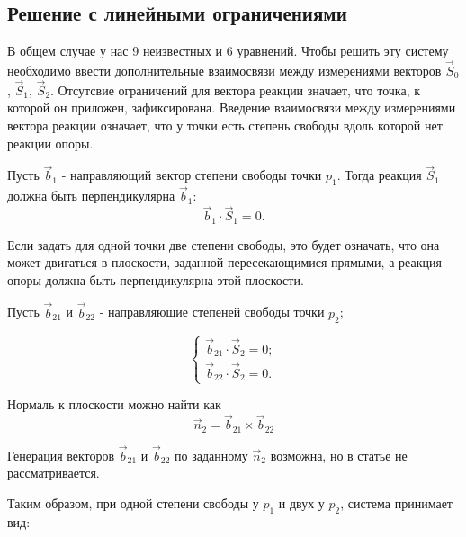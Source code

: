 \subsection{Решение с линейными ограничениями}

В общем случае у нас 9 неизвестных и 6 уравнений.
Чтобы решить эту систему необходимо ввести дополнительные взаимосвязи между измерениями векторов $\vec{S}_0$, $\vec{S}_1$, $\vec{S}_2$.
Отсутсвие ограничений для вектора реакции значает, что точка, к которой он приложен, зафиксирована.
Введение взаимосвязи между измерениями вектора реакции означает, что у точки есть степень свободы вдоль которой нет реакции опоры.

Пусть $\vec b_1$ - направляющий вектор степени свободы точки $p_1$.
Тогда реакция $\vec S_1$ должна быть перпендикулярна $\vec b_1$:
\begin{equation}
	\vec b_1 \cdot \vec S_1 = 0.
\end{equation}

Если задать для одной точки две степени свободы, это будет означать, что она может двигаться в плоскости, заданной пересекающимися прямыми, а реакция опоры должна быть перпендикулярна этой плоскости.

Пусть $\vec b_{21}$ и $\vec b_{22}$ - направляющие степеней свободы точки $p_2$;

\begin{equation}
\left\{
	\begin{gathered}
		\vec b_{21} \cdot \vec S_2 = 0;\\
		\vec b_{22} \cdot \vec S_2 = 0.
	\end{gathered}
\right.
\end{equation}

Нормаль к плоскости можно найти как $$\vec n_2 = \vec b_{21} \times \vec b_{22}$$

Генерация векторов $\vec b_{21}$ и $\vec b_{22}$ по заданному $\vec n_2$ возможна, но в статье не рассматривается.

Таким образом, при одной степени свободы у $p_1$ и двух у $p_2$, система принимает вид:

